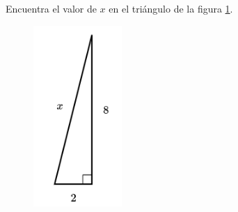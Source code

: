 \question[15]  Encuentra el valor de $x$ en el triángulo de la figura \ref{fig:lados_pitagoras_17}.
\begin{figure}[H]
    \begin{center}
        \includegraphics[width=0.3\textwidth]{../images/lados_pitagoras_17.png}
    \end{center}
    \caption{}
    \label{fig:lados_pitagoras_17}
\end{figure}